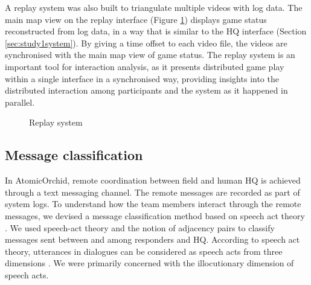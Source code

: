 A replay system was also built to triangulate multiple videos with log data. The main map view on the replay interface (Figure \ref{fig:replay}) displays game status reconstructed from log data, in a way that is similar to the HQ interface (Section \ref{sec:study1system}). By giving a time offset to each video file, the videos are synchronised with the main map view of game status. The replay system is an important tool for interaction analysis, as it presents distributed game play within a single interface in a synchronised way, providing insights into the distributed interaction among participants and the system as it happened in parallel. \\

\begin{figure}[H]
  \centering
  
   \caption{Replay system}
  \label{fig:replay}
\end{figure}
\newpage
\subsection{Message classification} \label{sec:aprmsg}
In AtomicOrchid, remote coordination between field and human HQ is achieved through a text messaging channel. The remote messages are recorded as part of system logs. To understand how the team members interact through the remote messages, we devised a message classification method based on speech act theory \citep{Searle1976}. We used speech-act theory and the notion of adjacency pairs \citep{Avrahami} to classify messages sent between and among responders and HQ. According to speech act theory, utterances in dialogues can be considered as speech acts from three dimensions \citep{Searle1976}. We were primarily concerned with the illocutionary dimension of speech acts.\\

